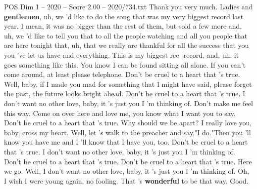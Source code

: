 \begin{textsample}{POS Dim 1 – 2020 – Score 2.00 – 2020/734.txt}  \label{ex:f1_pos_002}
Thank you very much.
Ladies and \textbf{gentlemen}, uh, we 'd like to do the song that was my very biggest record last year.
I mean, it was no bigger than the rest of them, but sold a few more and, uh, we 'd like to tell you that to all the people watching and all you people that are here tonight that, uh, that we really are thankful for all the success that you you 've let us have and everything.
This is my biggest rec- record, and, uh, it goes something like this.
You know I can be found sitting all alone.
If you can't come around, at least please telephone.
Don't be cruel to a heart that 's true.
Well, baby, if I made you mad for something that I might have said, please forget the past, the future looks bright ahead.
Don't be cruel to a heart that 's true.
I don't want no other love, baby, it 's just you I 'm thinking of.
Don't make me feel this way.
Come on over here and love me, you know what I want you to say.
Don't be cruel to a heart that 's true.
Why should we be apart?
I really love you, baby, cross my heart.
Well, let 's walk to the preacher and say,"I do."Then you 'll know you have me and I 'll know that I have you, too.
Don't be cruel to a heart that 's true.
I don't want no other love, baby, it 's just you I 'm thinking of.
Don't be cruel to a heart that 's true.
Don't be cruel to a heart that 's true.
Here we go.
Well, I don't want no other love, baby, it 's just you I 'm thinking of.
Oh, I wish I were young again, no fooling.
That 's \textbf{wonderful} to be that way.
Good.

\end{textsample}
